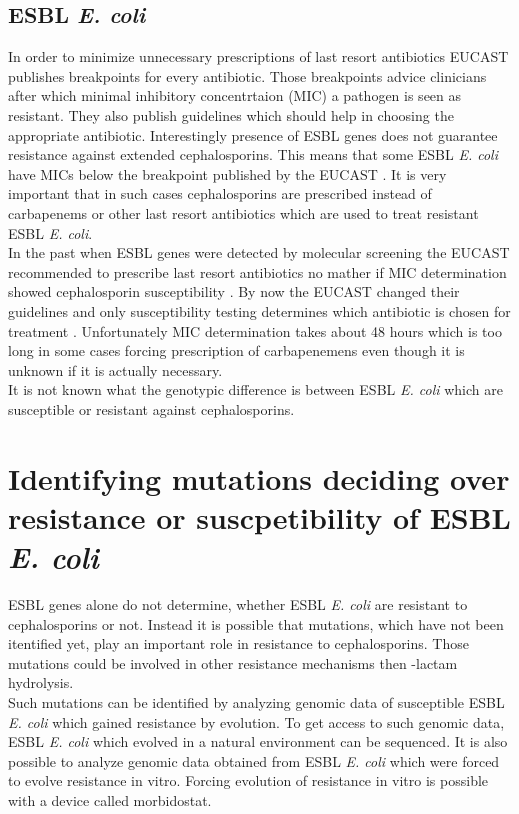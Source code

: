 \subsection{ESBL \textit{E. coli}}
In order to minimize unnecessary prescriptions of last resort antibiotics EUCAST publishes breakpoints for every antibiotic. Those breakpoints advice clinicians after which minimal inhibitory concentrtaion (MIC) a pathogen is seen as resistant. They also publish guidelines which should help in choosing the appropriate antibiotic. Interestingly presence of ESBL genes does not guarantee resistance against extended cephalosporins. This means that some ESBL \textit{E. coli} have MICs below the breakpoint published by the EUCAST \cite{tissot_enterobacteriaceae_nodate}. It is very important that in such cases cephalosporins are prescribed instead of carbapenems or other last resort antibiotics which are used to treat resistant ESBL \textit{E. coli}. \\
In the past when ESBL genes were detected by molecular screening the EUCAST recommended to prescribe last resort antibiotics no mather if MIC determination showed cephalosporin susceptibility \cite{leclercq_eucast_2013}. By now the EUCAST changed their guidelines and only susceptibility testing determines which antibiotic is chosen for treatment \cite{leclercq_eucast_2013}. Unfortunately MIC determination takes about 48 hours which is too long in some cases forcing prescription of carbapenemens even though it is unknown if it is actually necessary.\\
It is not known what the genotypic difference is between ESBL \textit{E. coli} which are susceptible or resistant against cephalosporins.   

\section{Identifying mutations deciding over resistance or suscpetibility of ESBL \textit{E. coli}}
ESBL genes alone do not determine, whether ESBL \textit{E. coli} are resistant to cephalosporins or not. Instead it is possible that mutations, which have not been itentified yet, play an important role in resistance to cephalosporins. Those mutations could be involved in other resistance mechanisms then \textbeta-lactam hydrolysis. \\
Such mutations can be identified by analyzing genomic data of susceptible ESBL \textit{E. coli} which gained resistance by evolution. To get access to such genomic data, ESBL \textit{E. coli} which evolved in a natural environment can be sequenced. It is also possible to analyze genomic data obtained from ESBL \textit{E. coli} which were forced to evolve resistance in vitro. Forcing evolution of resistance in vitro is possible with a device called morbidostat.

